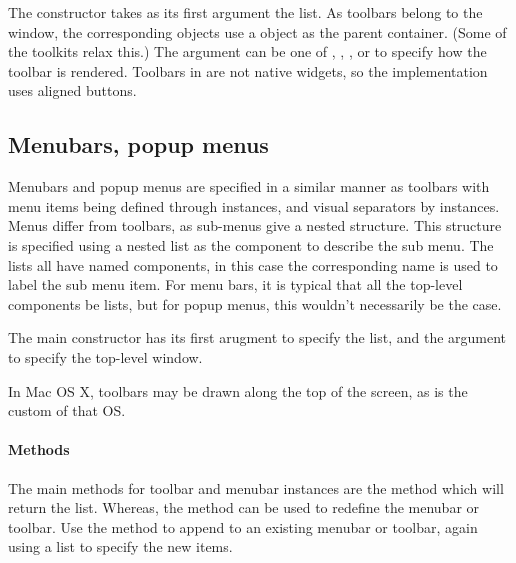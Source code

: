 The  constructor takes as its first argument the
list.  As toolbars belong to the window, the corresponding
 objects use a  object as the
parent container. (Some of the toolkits relax this.)  The argument
 can be one of ,
, , or  to specify how
the toolbar is rendered. Toolbars in  are not
native widgets, so the implementation uses aligned buttons.




\subsection{Menubars, popup menus}
\label{sec:gWidgets-menubars}

Menubars and popup menus are specified in a similar manner as toolbars with menu items
being defined through  instances, and visual separators
by  instances. Menus differ from toolbars, as
sub-menus give a nested structure. This structure is specified using a
nested list as the component to describe the sub menu. The lists all
have named components, in this case the corresponding name is used to
label the sub menu item. For menu bars, it is typical that all the
top-level components be lists, but for popup menus, this wouldn't
necessarily be the case.

The main constructor  has its first arugment to
specify the list, and the  argument to specify the
top-level window. 

In Mac OS X, toolbars may be drawn along the top of the screen, as is the custom of that OS.

\paragraph{Methods}
The main methods for toolbar and menubar instances are
the  method which will return the list. Whereas, the
 method can be used to redefine the
menubar or toolbar. Use the  method to append to an
existing menubar or toolbar, again using a list to specify the new items.


